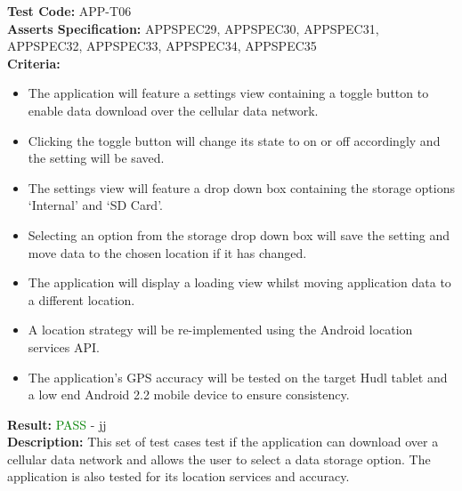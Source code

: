\documentclass[11pt,a4paper]{report}
\begin{document}
\label{test:APP-T06}
\noindent\textbf{Test Code:} APP-T06\\
\textbf{Asserts Specification:} APPSPEC29, APPSPEC30, APPSPEC31, APPSPEC32, APPSPEC33, APPSPEC34, APPSPEC35\\ 
\textbf{Criteria:} \begin{itemize}
                     \item The application will feature a settings view containing a toggle button to enable data download over the cellular data network.
                     \item Clicking the toggle button will change its state to on or off accordingly and the setting will be saved.
                     \item The settings view will feature a drop down box containing the storage options `Internal' and `SD Card'.
                     \item Selecting an option from the storage drop down box will save the setting and move data to the chosen location if it has changed.
                     \item The application will display a loading view whilst moving application data to a different location.
                     \item A location strategy will be re-implemented using the Android location services API.
                     \item The application's GPS accuracy will be tested on the target Hudl tablet and a low end Android 2.2 mobile device to ensure consistency. 
                     \end{itemize}
                   
\textbf{Result:} \textcolor{green}{PASS} - jj\\
\textbf{Description:} This set of test cases test if the application can download over a cellular data network and allows the user to select a data storage option. The application is also tested for its location services and accuracy.\\
\end{document}
